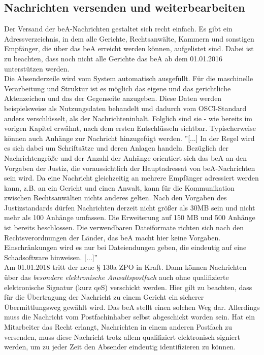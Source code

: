 \subsection{Nachrichten versenden und weiterbearbeiten}
Der Versand der beA-Nachrichten gestaltet sich recht einfach. Es gibt ein Adressverzeichnis, in dem alle Gerichte, Rechtsanwälte, Kammern und sonstigen Empfänger, die über das beA erreicht werden können, aufgelistet sind. Dabei ist zu beachten, dass noch nicht alle Gerichte das beA ab dem 01.01.2016 unterstützen werden. \\
Die Absenderzeile wird vom System automatisch ausgefüllt. Für die maschinelle Verarbeitung und Struktur ist es möglich das eigene und das gerichtliche Aktenzeichen und das der Gegenseite anzugeben. Diese Daten werden beispielsweise als Nutzungsdaten behandelt und dadurch vom OSCI-Standard anders verschlüsselt, als der Nachrichteninhalt. Folglich sind sie - wie bereits im vorigen Kapitel erwähnt, nach dem ersten Entschlüsseln sichtbar. Typischerweise können auch Anhänge zur Nachricht hinzugefügt werden. ''[...] In der Regel wird es sich dabei um Schriftsätze und deren Anlagen handeln. Bezüglich der Nachrichtengröße und der Anzahl der Anhänge orientiert sich das beA an den Vorgaben der Justiz, die voraussichtlich der Hauptadressat von beA-Nachrichten sein wird. Da eine Nachricht gleichzeitig an mehrere Empfänger adressiert werden kann, z.B. an ein Gericht und einen Anwalt, kann für die Kommunikation zwischen Rechtsanwälten nichts anderes gelten. Nach den Vorgaben des Justizstandards dürfen Nachrichten derzeit nicht größer als 30MB sein und nicht mehr als 100 Anhänge umfassen. Die Erweiterung auf 150 MB und 500 Anhänge ist bereits beschlossen. Die verwendbaren Dateiformate richten sich nach den Rechtsverordnungen der Länder, das beA macht hier keine Vorgaben. Einschränkungen wird es nur bei Dateiendungen geben, die eindeutig auf eine Schadsoftware hinweisen. [...]'' \textcite{bea:bea:brak3-2015} \\
Am 01.01.2018 tritt der neue § 130a ZPO \textcite{bea:bea:zpo130} in Kraft. Dann können Nachrichten über das \textit{besondere elektronische Anwaltspostfach} auch ohne qualifizierte elektronische Signatur (kurz qeS) verschickt werden. Hier gilt zu beachten, dass für die Übertragung der Nachricht zu einem Gericht ein sicherer Übermittlungsweg gewählt wird. Das beA stellt einen solchen Weg dar. Allerdings muss die Nachricht vom Postfachinhaber selbst abgeschickt worden sein. Hat ein Mitarbeiter das Recht erlangt, Nachrichten in einem anderen Postfach zu versenden, muss diese Nachricht trotz allem qualifiziert elektronisch signiert werden, um zu jeder Zeit den Absender eindeutig identifizieren zu können. \\
